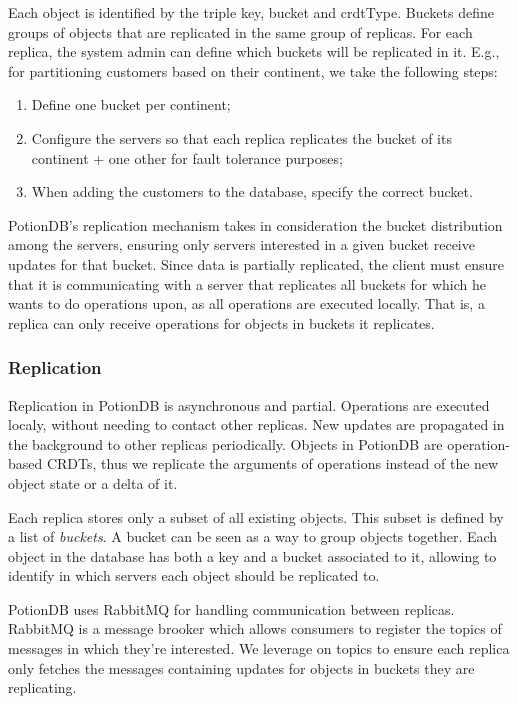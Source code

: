 \documentclass{vldb}
\begin{document}
Each object is identified by the triple key, bucket and crdtType.
Buckets define groups of objects that are replicated in the same group of replicas.
For each replica, the system admin can define which buckets will be replicated in it.
E.g., for partitioning customers based on their continent, we take the following steps:

\begin{enumerate}
	\item Define one bucket per continent;
	\item Configure the servers so that each replica replicates the bucket of its continent + one other for fault tolerance purposes;
	\item When adding the customers to the database, specify the correct bucket.
\end{enumerate}

PotionDB's replication mechanism takes in consideration the bucket distribution among the servers, ensuring only servers interested in a given bucket receive updates for that bucket.
Since data is partially replicated, the client must ensure that it is communicating with a server that replicates all buckets for which he wants to do operations upon, as all operations are executed locally.
That is, a replica can only receive operations for objects in buckets it replicates.

\subsubsection{Replication}
\label{subsubsec:replication}

Replication in PotionDB is asynchronous and partial.
Operations are executed localy, without needing to contact other replicas.
New updates are propagated in the background to other replicas periodically.
Objects in PotionDB are operation-based CRDTs, thus we replicate the arguments of operations instead of the new object state or a delta of it.

Each replica stores only a subset of all existing objects.
This subset is defined by a list of \emph{buckets}.
A bucket can be seen as a way to group objects together.
Each object in the database has both a key and a bucket associated to it, allowing to identify in which servers each object should be replicated to.

PotionDB uses RabbitMQ \cite{???} for handling communication between replicas.
RabbitMQ is a message brooker which allows consumers to register the topics of messages in which they're interested.
We leverage on topics to ensure each replica only fetches the messages containing updates for objects in buckets they are replicating.
\end{document}
